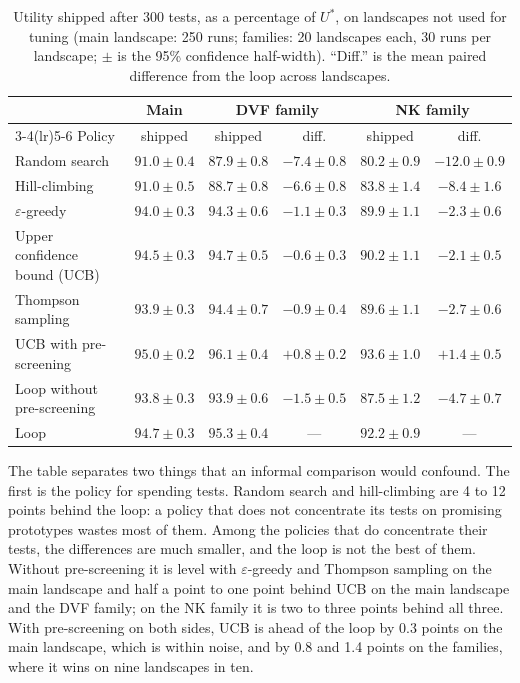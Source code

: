 \documentclass[10pt,twocolumn]{article}
\theoremstyle{definition}
\begin{document}
\begin{table}[t]
\caption{Utility shipped after 300 tests, as a percentage of $U^*$, on landscapes not used for tuning (main landscape: 250 runs; families: 20 landscapes each, 30 runs per landscape; $\pm$ is the 95\% confidence half-width). ``Diff.'' is the mean paired difference from the loop across landscapes.}
\label{tab:baselines}
\centering\small
\begin{tabular}{@{}lccccc@{}}
\toprule
& Main & \multicolumn{2}{c}{DVF family} & \multicolumn{2}{c}{NK family}\\
\cmidrule(lr){3-4}\cmidrule(lr){5-6}
Policy & shipped & shipped & diff. & shipped & diff.\\
\midrule
Random search & $91.0\pm0.4$ & $87.9\pm0.8$ & $-7.4\pm0.8$ & $80.2\pm0.9$ & $-12.0\pm0.9$\\
Hill-climbing & $91.0\pm0.5$ & $88.7\pm0.8$ & $-6.6\pm0.8$ & $83.8\pm1.4$ & $-8.4\pm1.6$\\
$\varepsilon$-greedy & $94.0\pm0.3$ & $94.3\pm0.6$ & $-1.1\pm0.3$ & $89.9\pm1.1$ & $-2.3\pm0.6$\\
Upper confidence bound (UCB) & $94.5\pm0.3$ & $94.7\pm0.5$ & $-0.6\pm0.3$ & $90.2\pm1.1$ & $-2.1\pm0.5$\\
Thompson sampling & $93.9\pm0.3$ & $94.4\pm0.7$ & $-0.9\pm0.4$ & $89.6\pm1.1$ & $-2.7\pm0.6$\\
\addlinespace[2pt]
UCB with pre-screening & $95.0\pm0.2$ & $96.1\pm0.4$ & $+0.8\pm0.2$ & $93.6\pm1.0$ & $+1.4\pm0.5$\\
Loop without pre-screening & $93.8\pm0.3$ & $93.9\pm0.6$ & $-1.5\pm0.5$ & $87.5\pm1.2$ & $-4.7\pm0.7$\\
Loop & $94.7\pm0.3$ & $95.3\pm0.4$ & --- & $92.2\pm0.9$ & ---\\
\bottomrule
\end{tabular}
\end{table}

The table separates two things that an informal comparison would confound. The first is the policy for spending tests. Random search and hill-climbing are 4 to 12 points behind the loop: a policy that does not concentrate its tests on promising prototypes wastes most of them. Among the policies that do concentrate their tests, the differences are much smaller, and the loop is not the best of them. Without pre-screening it is level with $\varepsilon$-greedy and Thompson sampling on the main landscape and half a point to one point behind UCB on the main landscape and the DVF family; on the NK family it is two to three points behind all three. With pre-screening on both sides, UCB is ahead of the loop by 0.3 points on the main landscape, which is within noise, and by 0.8 and 1.4 points on the families, where it wins on nine landscapes in ten.
\end{document}
